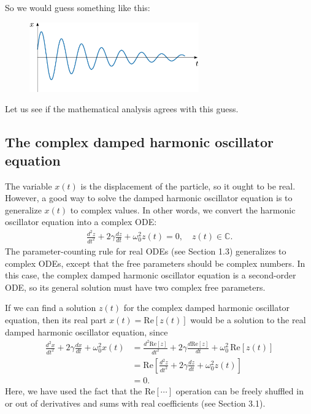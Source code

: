 \documentclass[10pt,a4paper]{article}
\begin{document}
So we would guess something like this:

\begin{figure}[ht]
  \centering\includegraphics[width=0.65\textwidth]{underdamped_guess}
\end{figure}

\noindent
Let us see if the mathematical analysis agrees with this guess.

\subsection{The complex damped harmonic oscillator equation}
\label{complex-solution}

The variable $x(t)$ is the displacement of the particle, so it ought
to be real. However, a good way to solve the damped harmonic
oscillator equation is to generalize $x(t)$ to complex values.  In
other words, we convert the harmonic oscillator equation into a
complex ODE:
\begin{align}
  \frac{d^2 z}{dt^2} + 2\gamma \frac{dz}{dt} + \omega_0^2 z(t) = 0, \quad z(t) \in \mathbb{C}.
\end{align}
The parameter-counting rule for real ODEs (see Section 1.3)
generalizes to complex ODEs, except that the free parameters should be
complex numbers. In this case, the complex damped harmonic oscillator
equation is a second-order ODE, so its general solution must have two
complex free parameters.

If we can find a solution $z(t)$ for the complex damped harmonic
oscillator equation, then its real part $x(t) = \mathrm{Re}[z(t)]$
would be a solution to the real damped harmonic oscillator equation,
since
\begin{align}
  \frac{d^2 x}{dt^2} + 2\gamma \frac{dx}{dt} + \omega_0^2 x(t) &= \frac{d^2 \mathrm{Re}[z]}{dt^2} + 2\gamma \frac{d \mathrm{Re}[z]}{dt} + \omega_0^2 \, \mathrm{Re}[z(t)] \\
  &= \mathrm{Re}\left[\frac{d^2 z}{dt^2} + 2\gamma \frac{dz}{dt} + \omega_0^2 z(t)\right] \\
  &= 0.
\end{align}
Here, we have used the fact that the $\mathrm{Re}[\cdots]$ operation
can be freely shuffled in or out of derivatives and sums with real
coefficients (see Section 3.1).
\end{document}
